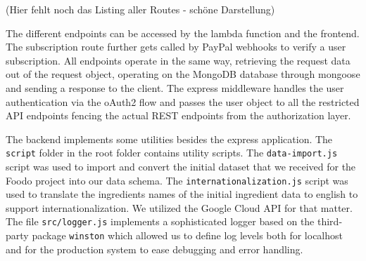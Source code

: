 (Hier fehlt noch das Listing aller Routes - schöne Darstellung)

The different endpoints can be accessed by the lambda function and the frontend. The subscription route further gets called by PayPal webhooks to verify a user subscription. All endpoints operate in the same way, retrieving the request data out of the request object, operating on the MongoDB database through mongoose and sending a response to the client. The express middleware handles the user authentication via the oAuth2 flow and passes the user object to all the restricted API endpoints fencing the actual REST endpoints from the authorization layer. 


The backend implements some utilities besides the express application. The \texttt{script} folder in the root folder contains utility scripts. The \texttt{data-import.js} script was used to import and convert the initial dataset that we received for the Foodo project into our data schema. The \texttt{internationalization.js} script was used to translate the ingredients names of the initial ingredient data to english to support internationalization. We utilized the Google Cloud API for that matter. The file \texttt{src/logger.js} implements a sophisticated logger based on the third-party package \texttt{winston} which allowed us to define log levels both for localhost and for the production system to ease debugging and error handling. 

